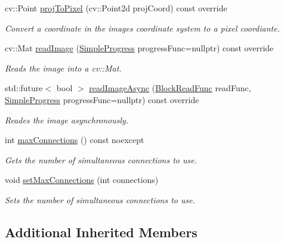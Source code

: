\begin{DoxyCompactItemize}
cv\+::\+Point \hyperlink{classdg_1_1deepcore_1_1imagery_1_1_map_service_image_a7eaf758ec97a0ffc997721a82beb907a}{proj\+To\+Pixel} (cv\+::\+Point2d proj\+Coord) const override
\begin{DoxyCompactList}\small\item\em Convert a coordinate in the image\textquotesingle{}s coordinate system to a pixel coordiante. \end{DoxyCompactList}\item 
cv\+::\+Mat \hyperlink{classdg_1_1deepcore_1_1imagery_1_1_map_service_image_a85793caaddbd6781c6cdc2b8047d2470}{read\+Image} (\hyperlink{group___utility_module_ga6763018df79e4bdbcd8cd14cea5342b2}{Simple\+Progress} progress\+Func=nullptr) const override
\begin{DoxyCompactList}\small\item\em Reads the image into a cv\+::\+Mat. \end{DoxyCompactList}\item 
std\+::future$<$ bool $>$ \hyperlink{classdg_1_1deepcore_1_1imagery_1_1_map_service_image_a4629dabbfca2f1f2ecddcc2439438ff0}{read\+Image\+Async} (\hyperlink{group___imagery_module_ga2238c2ef34502f68956ddef1f477ad95}{Block\+Read\+Func} read\+Func, \hyperlink{group___utility_module_ga6763018df79e4bdbcd8cd14cea5342b2}{Simple\+Progress} progress\+Func=nullptr) const override
\begin{DoxyCompactList}\small\item\em Reades the image asynchronously. \end{DoxyCompactList}\item 
int \hyperlink{group___imagery_module_ga1774c7d4c06c8e18a98db65b088b19b9}{max\+Connections} () const noexcept
\begin{DoxyCompactList}\small\item\em Gets the number of simultaneous connections to use. \end{DoxyCompactList}\item 
void \hyperlink{group___imagery_module_gacdb5a20006863ccb0f9601362e635df9}{set\+Max\+Connections} (int connections)
\begin{DoxyCompactList}\small\item\em Sets the number of simultaneous connections to use. \end{DoxyCompactList}\end{DoxyCompactItemize}
\subsection*{Additional Inherited Members}


